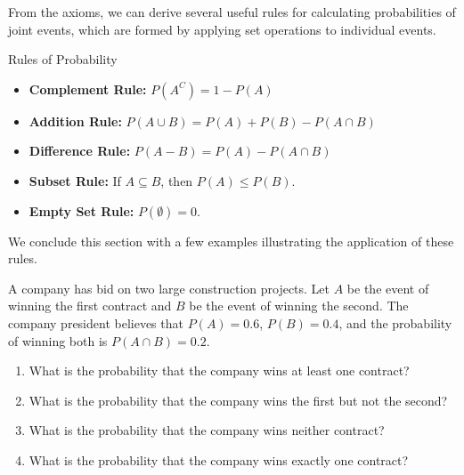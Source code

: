 From the axioms, we can derive several useful rules for calculating probabilities of joint events, which are formed by applying set operations to individual events.

\begin{theorem}{Rules of Probability}
    \begin{itemize}
        \item \textbf{Complement Rule:} $P(A^C) = 1 - P(A)$
        \item \textbf{Addition Rule:} $P(A \cup B) = P(A) + P(B) - P(A \cap B)$
        \item \textbf{Difference Rule:} $P(A-B) = P(A) - P(A \cap B)$
        \item \textbf{Subset Rule:} If $A \subseteq B$, then $P(A) \leq P(B)$.
        \item \textbf{Empty Set Rule:} $P(\emptyset) = 0$.
    \end{itemize}
\end{theorem}

We conclude this section with a few examples illustrating the application of these rules.

\begin{example}
    A company has bid on two large construction projects. Let $A$ be the event of winning the first contract and $B$ be the event of winning the second. The company president believes that $P(A) = 0.6$, $P(B) = 0.4$, and the probability of winning both is $P(A \cap B) = 0.2$.

    \begin{enumerate}[label=(\alph*)]
        \item What is the probability that the company wins at least one contract?
        \item What is the probability that the company wins the first but not the second?
        \item What is the probability that the company wins neither contract?
        \item What is the probability that the company wins exactly one contract?
    \end{enumerate}
\end{example}

